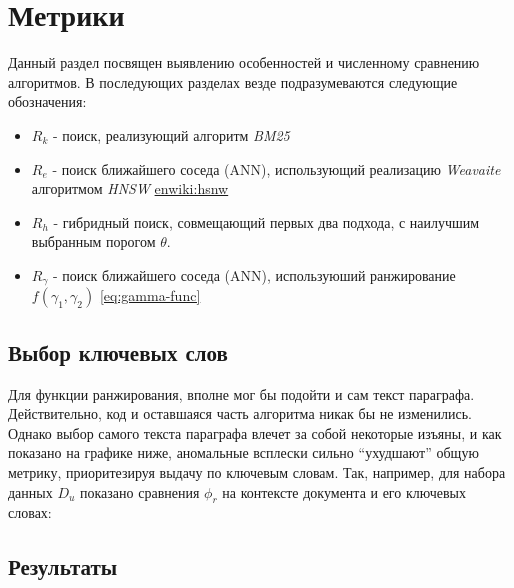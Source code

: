 
\section{Метрики}
\label{sec:metrics}

Данный раздел посвящен выявлению особенностей и численному сравнению алгоритмов. В последующих разделах везде подразумеваются следующие обозначения:

\begin{itemize}
    \item $R_k$ - поиск, реализующий алгоритм \textit{BM25} \cite{robertson2009probabilistic}
    \item $R_e$ - поиск ближайшего соседа (ANN), использующий реализацию \textit{Weavaite} \cite{weaviate} алгоритмом \textit{HNSW} \url{enwiki:hsnw}
    \item $R_h$ - гибридный поиск, совмещающий первых два подхода, с наилучшим выбранным порогом $\theta$.
    \item $R_{\gamma}$ - поиск ближайшего соседа (ANN), используюший ранжирование $f(\gamma_1, \gamma_2)$ \eqref{eq:gamma-func}
\end{itemize}


\subsection{Выбор ключевых слов}
\label{sec:keywords-vs-content}

Для функции ранжирования, вполне мог бы подойти и сам текст параграфа. Действительно, код и оставшаяся часть алгоритма никак бы не изменились. 
Однако выбор самого текста параграфа влечет за собой некоторые изъяны, и как показано на графике ниже, аномальные всплески сильно ``ухудшают'' общую метрику, 
приоритезируя выдачу по ключевым словам. Так, например, для набора данных $D_u$ показано сравнения $\phi_r$ на контексте документа и его ключевых словах:



\subsection{Результаты}
\label{sec:final-metrics}

